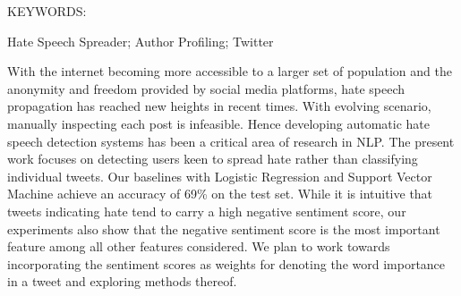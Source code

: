 \documentclass[BTech]{iitddiss}
\begin{document}
\abstract

\noindent KEYWORDS: \hspace*{0.5em} \parbox[t]{4.4in}{Hate Speech Spreader; Author Profiling; Twitter}

\vspace*{24pt}

\noindent With the internet becoming more accessible to a larger set of population and the anonymity and freedom provided by social media platforms, hate speech propagation has reached new heights in recent times. With evolving scenario, manually inspecting each post is infeasible. Hence developing automatic hate speech detection systems has been a critical area of research in NLP. The present work focuses on detecting users keen to spread hate rather than classifying individual tweets. Our baselines with Logistic Regression and Support Vector Machine achieve an accuracy of 69\% on the test set. While it is intuitive that tweets indicating hate tend to carry a high negative sentiment score, our experiments also show that the negative sentiment score is the most important feature among all other features considered. We plan to work towards incorporating the sentiment scores as weights for denoting the word importance in a tweet and exploring methods thereof.

\pagebreak


\begin{singlespace}
\tableofcontents
\thispagestyle{empty}

\listoftables
{}
\listoffigures
{}
\end{singlespace}


\abbreviations




\pagebreak
\end{document}

